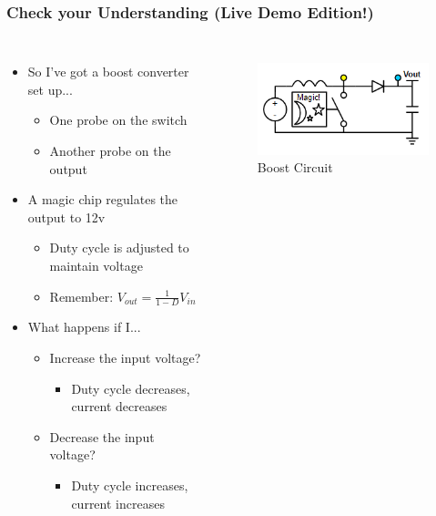 \documentclass{beamer}
\begin{document}
\begin{frame}
\frametitle{Check your Understanding {\small (Live Demo Edition!)}}
\begin{columns}[t]
\begin{itemize}
  \item So I've got a boost converter set up...
  \begin{itemize}
    \item One probe on the switch
    \item Another probe on the output
  \end{itemize}
  \item A magic chip regulates the output to 12v
  \begin{itemize}
    \item Duty cycle is adjusted to maintain voltage
    \item Remember: $V_{out}=\frac{1}{1-D} V_{in}$
  \end{itemize}
  \item What happens if I...
  \begin{itemize}
    \item <2->Increase the input voltage?
    \begin{itemize}
      \item <3->Duty cycle decreases, current decreases
    \end{itemize}
    \item <4->Decrease the input voltage?
    \begin{itemize}
      \item <5->Duty cycle increases, current increases
    \end{itemize}
  \end{itemize}
\end{itemize}

\begin{figure}
  \centering
  \includegraphics[scale=0.33]{images-dis4/smps-boost-probed-magic} \\
  Boost Circuit
\end{figure}
\end{columns}
\end{frame}
\end{document}
